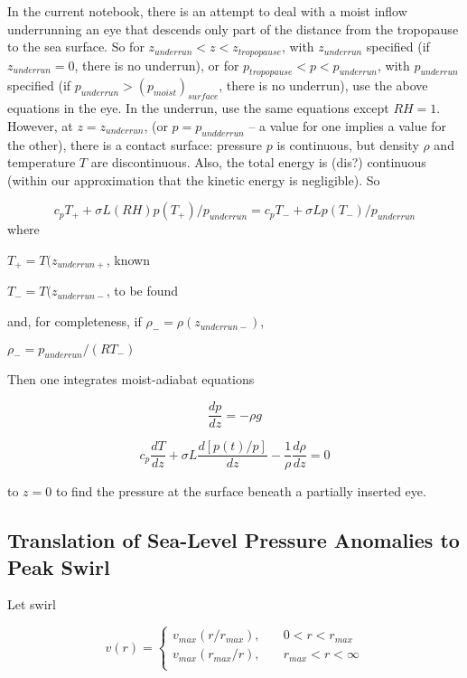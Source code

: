 \documentclass{article}
\begin{document}
In the current notebook, there is an attempt to deal with a moist inflow underrunning an eye that descends only part of the distance from the tropopause to the sea surface. So for $z_{underrun} < z < z_{tropopause}$, with $z_{underrun}$ specified (if $z_{underrun}=0$, there is no underrun), or for $p_{tropopause} < p < p_{underrun}$, with $p_{underrun}$ specified (if $p_{underrun} > (p_{moist})_{surface}$, there is no underrun), use the above equations in the eye. In the underrun, use the same equations except $RH=1$. However, at $z=z_{underrun}$, (or $p=p_{undderrun}$ -- a value for one implies a value for the other), there is a contact surface: pressure $p$ is continuous, but density $\rho$ and temperature $T$ are discontinuous. Also, the total energy is (dis?) continuous (within our approximation that the kinetic energy is negligible). So

\begin{equation}
	c_p T_+ + \sigma L (RH) p(T_+) / p_{underrun} = c_p T_- + \sigma L p(T_-) / p_{underrun}
\end{equation}
where

$T_+ = T(z_{underrun+}$, known

$T_- = T(z_{underrun-}$, to be found

and, for completeness, if $\rho_- = \rho(z_{underrun-})$,

$\rho_- = p_{underrun} / (RT_-)$

Then one integrates moist-adiabat equations

\begin{equation}
	\frac{dp}{dz} = -\rho g
\end{equation}

\begin{equation}
	c_p \frac{dT}{dz} + \sigma L \frac{d[p(t)/p]}{dz} - \frac{1}{\rho}\frac{d \rho}{dz} = 0
\end{equation}

to $z=0$ to find the pressure at the surface beneath a partially inserted eye.

\subsection{Translation of Sea-Level Pressure Anomalies to Peak Swirl}


Let swirl 

\begin{equation}
v(r) = 
\begin{cases} 
      v_{max}(r/r_{max}), \quad & 0 < r < r_{max} \\
      v_{max}(r_{max}/r),\quad & r_{max} < r < \infty \\
   \end{cases}
\end{equation}
\end{document}
